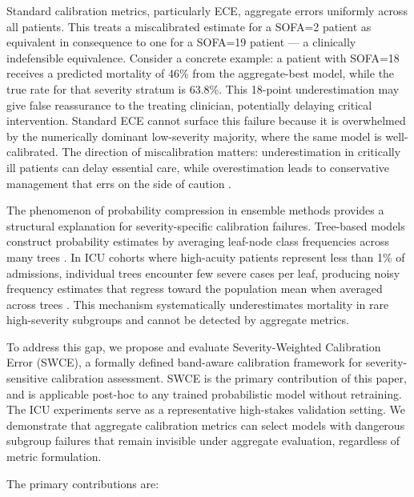 \documentclass{ieeeaccess}
\begin{document}
Standard calibration metrics, particularly ECE, aggregate errors uniformly across all patients. This treats a miscalibrated estimate for a SOFA=2 patient as equivalent in consequence to one for a SOFA=19 patient — a clinically indefensible equivalence. Consider a concrete example: a patient with SOFA=18 receives a predicted mortality of 46\% from the aggregate-best model, while the true rate for that severity stratum is 63.8\%. This 18-point underestimation may give false reassurance to the treating clinician, potentially delaying critical intervention. Standard ECE cannot surface this failure because it is overwhelmed by the numerically dominant low-severity majority, where the same model is well-calibrated. The direction of miscalibration matters: underestimation in critically ill patients can delay essential care, while overestimation leads to conservative management that errs on the side of caution \cite{b5}.

The phenomenon of probability compression in ensemble methods provides a structural explanation for severity-specific calibration failures. Tree-based models construct probability estimates by averaging leaf-node class frequencies across many trees \cite{b27}. In ICU cohorts where high-acuity patients represent less than 1\% of admissions, individual trees encounter few severe cases per leaf, producing noisy frequency estimates that regress toward the population mean when averaged across trees \cite{b7}. This mechanism systematically underestimates mortality in rare high-severity subgroups and cannot be detected by aggregate metrics.

To address this gap, we propose and evaluate Severity-Weighted Calibration Error (SWCE), a formally defined band-aware calibration framework for severity-sensitive calibration assessment. SWCE is the primary contribution of this paper, and is applicable post-hoc to any trained probabilistic model without retraining. The ICU experiments serve as a representative high-stakes validation setting. We demonstrate that aggregate calibration metrics can select models with dangerous subgroup failures that remain invisible under aggregate evaluation, regardless of metric formulation.

The primary contributions are:
\end{document}
